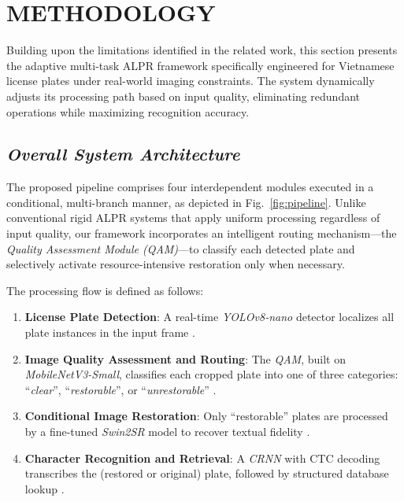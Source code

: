 \documentclass[a4paper,11pt,twocolumn]{article}
\begin{document}
	\section{METHODOLOGY}
	
	Building upon the limitations identified in the related work, this section presents the adaptive multi-task ALPR framework specifically engineered for Vietnamese license plates under real-world imaging constraints. The system dynamically adjusts its processing path based on input quality, eliminating redundant operations while maximizing recognition accuracy.
	
	\subsection{\textit{Overall System Architecture}}
	
	The proposed pipeline comprises four interdependent modules executed in a conditional, multi-branch manner, as depicted in Fig.~\ref{fig:pipeline}. Unlike conventional rigid ALPR systems that apply uniform processing regardless of input quality, our framework incorporates an intelligent routing mechanism—the \textit{Quality Assessment Module (QAM)}—to classify each detected plate and selectively activate resource-intensive restoration only when necessary.
	
	The processing flow is defined as follows:
	
	\begin{enumerate}
		\item \textbf{License Plate Detection}: A real-time \textit{YOLOv8-nano} detector localizes all plate instances in the input frame \cite{TranAnh2023LicensePR,Nguyen2025AnIO}.
		\item \textbf{Image Quality Assessment and Routing}: The \textit{QAM}, built on \textit{MobileNetV3-Small}, classifies each cropped plate into one of three categories: ``\textit{clear}'', ``\textit{restorable}'', or ``\textit{unrestorable}'' \cite{shin2024, lariqa, Tan2019EfficientNetRM, javad2025}.
		\item \textbf{Conditional Image Restoration}: Only ``restorable'' plates are processed by a fine-tuned \textit{Swin2SR} model to recover textual fidelity \cite{conde2022swin2sr}.
		\item \textbf{Character Recognition and Retrieval}: A \textit{CRNN} with CTC decoding transcribes the (restored or original) plate, followed by structured database lookup \cite{Yu2023SceneTR}.
	\end{enumerate}
	
\end{document}
